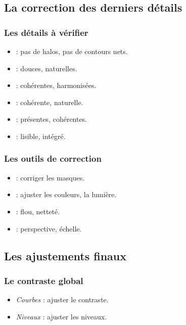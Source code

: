 \subsection{La correction des derniers détails}

\subsubsection{Les détails à vérifier}

\begin{itemize}
    \item {} : pas de halos, pas de contours nets.
    \item {} : douces, naturelles.
    \item {} : cohérentes, harmonisées.
    \item {} : cohérente, naturelle.
    \item {} : présentes, cohérentes.
    \item {} : lisible, intégré.
\end{itemize}

\subsubsection{Les outils de correction}

\begin{itemize}
    \item {} : corriger les masques.
    \item {} : ajuster les couleurs, la lumière.
    \item {} : flou, netteté.
    \item {} : perspective, échelle.
\end{itemize}

\subsection{Les ajustements finaux}

\subsubsection{Le contraste global}

\begin{itemize}
    \item {} \emph{Courbes} : ajuster le contraste.
    \item {} \emph{Niveaux} : ajuster les niveaux.
\end{itemize}


